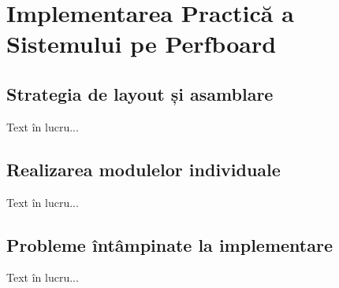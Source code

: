 \chapter{Implementarea Practică a Sistemului pe Perfboard \label{implementare}}
\section{Strategia de layout și asamblare}
Text în lucru...

\section{Realizarea modulelor individuale}
Text în lucru...

\section{Probleme întâmpinate la implementare}
Text în lucru...
